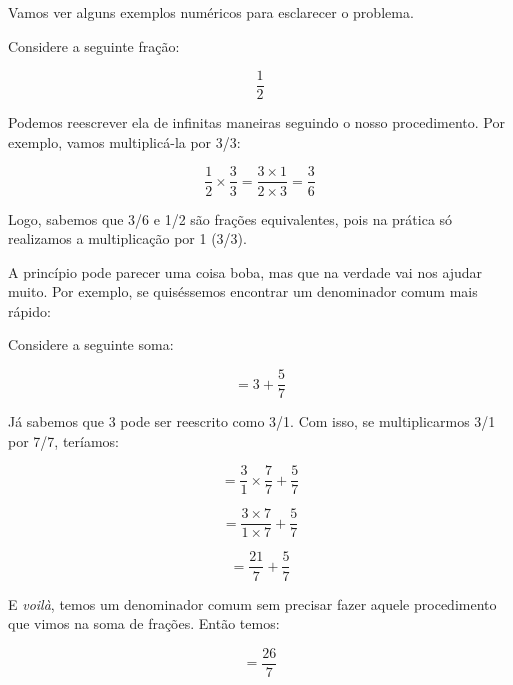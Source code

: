 Vamos ver alguns exemplos numéricos para esclarecer o problema.

\begin{exemplo}
    Considere a seguinte fração:

    \begin{equation}
        \frac{1}{2}
    \end{equation}

    Podemos reescrever ela de infinitas maneiras seguindo o nosso procedimento. Por exemplo, vamos multiplicá-la por 3/3:

    \begin{equation}
        \frac{1}{2}\times\frac{3}{3}=\frac{3\times1}{2\times3}=\frac{3}{6}
    \end{equation}

    Logo, sabemos que 3/6 e 1/2 são frações equivalentes, pois na prática só realizamos a multiplicação por 1 (3/3). 
\end{exemplo}

A princípio pode parecer uma coisa boba, mas que na verdade vai nos ajudar muito. Por exemplo, se quiséssemos encontrar um denominador comum mais rápido:

\begin{exemplo}
    Considere a seguinte soma:

    \begin{equation}
        =3+\frac{5}{7}
    \end{equation}

    Já sabemos que 3 pode ser reescrito como 3/1. Com isso, se multiplicarmos 3/1 por 7/7, teríamos: 

    \begin{equation}
        =\frac{3}{1}\times\frac{7}{7} + \frac{5}{7}
    \end{equation}

    \begin{equation}
        =\frac{3\times7}{1\times7}+ \frac{5}{7}
    \end{equation}

    \begin{equation}
        =\frac{21}{7}+ \frac{5}{7}
    \end{equation}

    E \textit{voilà}, temos um denominador comum sem precisar fazer aquele procedimento que vimos na soma de frações. Então temos:

    \begin{equation}
        =\frac{26}{7}
    \end{equation}

    
\end{exemplo}

